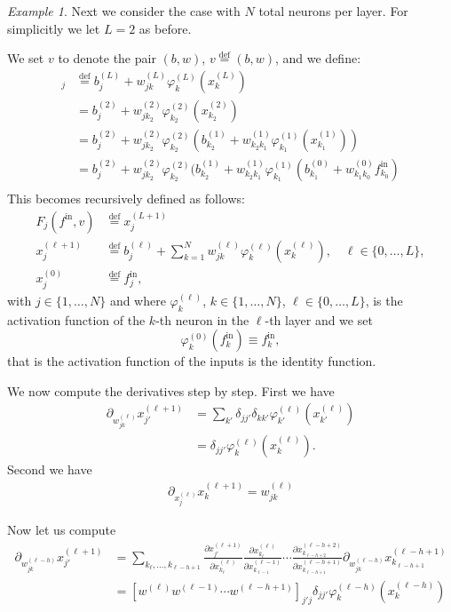 \documentclass[10pt, a4paper]{article}
\theoremstyle{plain}
\theoremstyle{definition}
\theoremstyle{definition}
\theoremstyle{definition}
\theoremstyle{definition}
\theoremstyle{definition}
\theoremstyle{definition}
\theoremstyle{definition}
\theoremstyle{remark}
\theoremstyle{remark}
\newtheorem{example}[theorem]{Example}
\theoremstyle{rudin-style-generic}
\theoremstyle{rudin-style-generic*}
\theoremstyle{rudin-style-theorem}
\newcommand{\deq}{\stackrel{\mathrm{def}}{=}}
\begin{document}
\begin{example}
Next we consider the case with $N$ total neurons per layer.
For simplicitly we let
$L=2$ as before.

We set $v$ to denote the pair $(b,w)$,
$v \deq (b,w)$,
and we define:
\begin{align*}
	[F(f_{\text{in}}, v)]_{j} 
	&\deq b^{(L)}_j  +  w^{(L)}_{jk} \varphi^{(L)}_k( x^{(L)}_k ) \\
	&= b^{(2)}_j + w^{(2)}_{jk_2} \varphi^{(2)}_{k_2}( x^{(2)}_{k_2} ) \\
	&= b^{(2)}_j + w^{(2)}_{jk_2} \varphi^{(2)}_{k_2}( b^{(1)}_{k_2} + w^{(1)}_{k_2 k_1} \varphi^{(1)}_{k_1}( x^{(1)}_{k_1} )  ) \\
	&= b^{(2)}_j + w^{(2)}_{jk_2} \varphi^{(2)}_{k_2}( b^{(1)}_{k_2} + w^{(1)}_{k_2 k_1} \varphi^{(1)}_{k_1}( 
									b^{(0)}_{k_1} + w^{(0)}_{k_1 k_0} f^{\text{in}}_{k_0}   ) \\
\end{align*}
This becomes recursively defined as follows:
\begin{align*}
	F_j(f^{\text{in}}, v)
	&\deq x^{(L+1)}_j\\
	x^{(\ell+1)}_{j} &\deq b^{(\ell)}_j + \sum_{k=1}^N w^{(\ell)}_{jk}\varphi^{(\ell)}_k ( x^{(\ell)}_k ),
		\quad \ell\in \{0,\dots, L\},\\
	x^{(0)}_j &\deq f^{\text{in}}_j
	,
\end{align*}
with $j\in\{1,\dots,N\}$
and
where $\varphi^{(\ell)}_k$, $k\in\{1,\dots,N\}$, $\ell\in\{0,\dots,L\}$, 
is the activation function of the $k$-th neuron in the $\ell$-th layer and we set
$$
\varphi^{(0)}_k ( f^{\text{in}}_k ) \equiv f^{\text{in}}_k 
,
$$
that is the activation function of the inputs is the identity function. 

We now compute the derivatives step by step.
First we have
\begin{align*}
	\partial_{w^{(\ell)}_{jk} } x^{(\ell+1)}_{j'}
	&= 
	\sum_{k'} \delta_{jj'}\delta_{kk'} \varphi^{(\ell)}_{k'}(x^{(\ell)}_{k'} ) \\
	&=
	\delta_{jj'} \varphi^{(\ell)}_k ( x^{(\ell)}_k )
	.
\end{align*}
Second we have
\begin{align*}
	\partial_{x^{(\ell)}_j } x^{(\ell+1)}_k = w^{(\ell)}_{jk} 
\end{align*}

Now let us compute
\begin{align*}
	\partial_{w^{(\ell-h)}_{jk}} x^{(\ell+1)}_{j'}
	&= 
	\sum_{k_{\ell},\dots,k_{\ell-h+1}}
		\frac{\partial x^{(\ell+1)}_{j'} }{ \partial x^{(\ell)}_{k_\ell} }
		\frac{\partial x^{(\ell)}_{k_\ell} }{ \partial x^{(\ell-1)}_{k_{\ell-1}} } 
			\cdots \frac{\partial x^{(\ell-h+2)}_{k_{\ell-h+2}} }{ \partial x^{(\ell-h+1)}_{k_{\ell-h+1}} } 
				\partial_{w^{(\ell-h)}_{jk} } x^{(\ell-h+1)}_{k_{\ell-h+1}} \\
	&=
	[ w^{(\ell)} w^{(\ell-1)}\cdots w^{(\ell-h+1)} ]_{j' j} \delta_{jj'} \varphi^{(\ell-h)}_k( x^{(\ell-h)}_k )
\end{align*}






\end{example}
\end{document}

